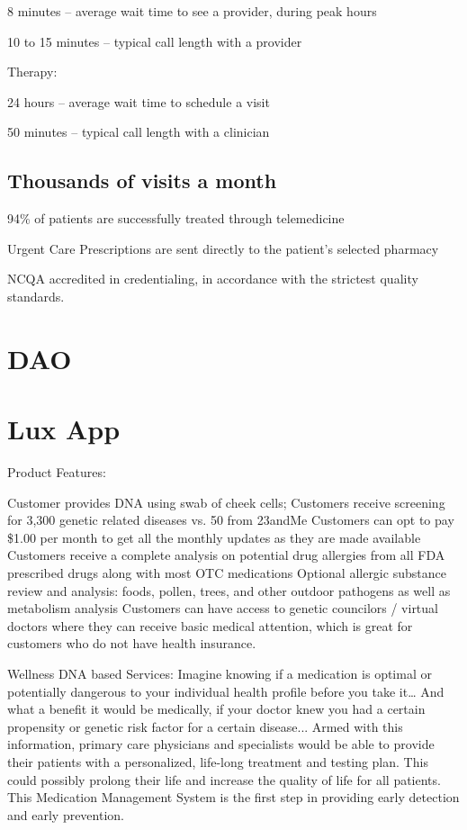 \documentclass[11pt]{article}
\begin{document}
8 minutes -- average wait time to see a provider, during peak hours


10 to 15 minutes -- typical call length with a provider


Therapy:


24 hours -- average wait time to schedule a visit


50 minutes -- typical call length with a clinician


\subsection{Thousands of visits a month}

94\% of patients are successfully treated through telemedicine


Urgent Care Prescriptions are sent directly to the patient's selected pharmacy


NCQA accredited in credentialing, in accordance with the strictest quality standards.


\section{DAO}

\section{Lux App}

Product Features:


Customer provides DNA using swab of cheek cells; Customers receive screening for 3,300 genetic related diseases vs. 50 from 23andMe Customers can opt to pay \$1.00 per month to get all the monthly updates as they are made available Customers receive a complete analysis on potential drug allergies from all FDA prescribed drugs along with most OTC medications Optional allergic substance review and analysis: foods, pollen, trees, and other outdoor pathogens as well as metabolism analysis Customers can have access to genetic councilors / virtual doctors where they can receive basic medical attention, which is great for customers who do not have health insurance.


Wellness DNA based Services: Imagine knowing if a medication is optimal or potentially dangerous to your individual health profile before you take it\ldots{} And what a benefit it would be medically, if your doctor knew you had a certain propensity or genetic risk factor for a certain disease... Armed with this information, primary care physicians and specialists would be able to provide their patients with a personalized, life-long treatment and testing plan. This could possibly prolong their life and increase the quality of life for all patients. This Medication Management System is the first step in providing early detection and early prevention.
\end{document}
